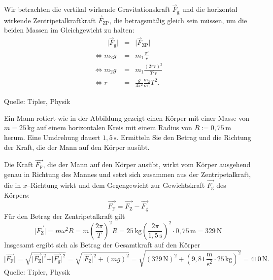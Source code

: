 \begin{MExercises}
\begin{MExercise}
  \begin{MSolution}
  Wir betrachten die vertikal wirkende Gravitationskraft $\vec{F}_{\textrm{g}}$ und die horizontal wirkende Zentripetalkraftkraft $\vec{F}_{{\textrm{ZP}}}$, die betragsm\"a{\ss}ig gleich sein m\"ussen, um die beiden Massen im Gleichgewicht zu halten:
  \begin{eqnarray*}
  \qquad\vert\vec{F}_{\textrm{g}}\vert&=&\vert\vec{F}_{\textrm{ZP}}\vert\\
  \Leftrightarrow m_2g&=&m_1\frac{v^2}{r}\\
  \Leftrightarrow m_2g&=&m_1\frac{(2\pi r)^2}{T^2r}\\
  \Leftrightarrow r&=&\frac{g}{4\pi^2}\frac{m_2}{m_1}T^2.
  \end{eqnarray*}
  \end{MSolution}
  Quelle: Tipler, Physik
  \end{MExercise}
  
  \begin{MExercise}
  Ein Mann rotiert wie in der Abbildung gezeigt einen K\"orper mit einer Masse von $m=25\,\text{kg}$ auf einem horizontalen Kreis mit einem Radius von $R:=0{,}75\,\text{m}$ herum. Eine Umdrehung dauert $1{,}5\,\text{s}$. Ermitteln Sie den Betrag und die Richtung der Kraft, die der Mann auf den K\"orper aus\"ubt. 
  
  
  
  \begin{MSolution}
  Die Kraft $\vec{F_{\textrm{F}}}$, die der Mann auf den K\"orper aus\"ubt, wirkt vom K\"orper ausgehend genau in Richtung des Mannes und setzt sich zusammen aus der Zentripetalkraft, die in $x$--Richtung wirkt und dem Gegengewicht zur Gewichtskraft $\vec{F_{\textrm{g}}}$ des K\"orpers:
  $$
  \vec{F_{\textrm{F}}}=\vec{F_{\textrm{Z}}}-\vec{F_{\textrm{g}}}
  $$
  F\"ur den Betrag der Zentripetalkraft gilt
  $$
  \vert\vec{F_{\textrm{Z}}}\vert=m\omega^2R=m\left(\frac{2\pi}{T}\right)^2R=25\,\text{kg}\left(\frac{2\pi}{1,5\,\text{s}}\right)^2\cdot 0,75\,\text{m}=329\,\text{N}
  $$Insgesamt ergibt sich als Betrag der Gesamtkraft auf den K\"orper
  $$
  \vert\vec{F_{\textrm{F}}}\vert=\sqrt{\vert\vec{F_{\textrm{Z}}}\vert^2+\vert\vec{F_{\textrm{g}}}\vert^2}=\sqrt{\vert\vec{F_{\textrm{Z}}}
  \vert^2+(mg)^2}=\sqrt{(329\,\text{N})^2+\left(9{,}81\,\frac{\text{m}}{\text{s}^2}\cdot 
  25\,\text{kg}\right)^2}=410\,\text{N}.
    $$
    Quelle: Tipler, Physik
  \end{MSolution}
  \end{MExercise}
  

\end{MExercises}
